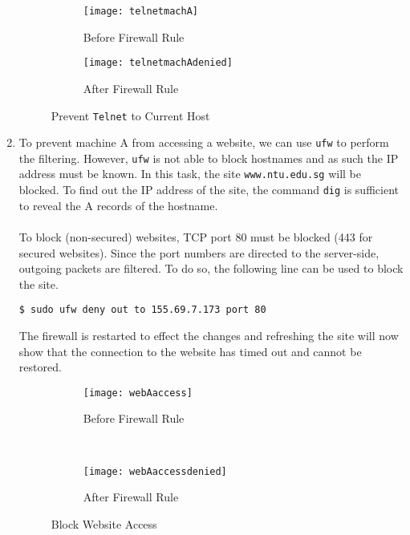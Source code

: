 \documentclass[a4paper,12pt]{article}
\begin{document}
\begin{enumerate}
\begin{figure}[H]
    \centering
\begin{subfigure}[H]{1\textwidth}
\centering
\texttt{[image: telnetmachA]}
\caption{Before Firewall Rule}
\label{fig:MachA}
\end{subfigure}
\vspace{1em}
\begin{subfigure}[H]{1\textwidth}
\centering
\texttt{[image: telnetmachAdenied]}
\caption{After Firewall Rule}
\label{fig:MachADenied}
\end{subfigure}
    \caption{Prevent \texttt{Telnet} to Current Host}
\end{figure}
\item To prevent machine A from accessing a website, we can use \texttt{ufw} to perform the filtering. However, \texttt{ufw} is not able to block hostnames and as such the IP address must be known. In this task, the site \texttt{www.ntu.edu.sg} will be blocked. To find out the IP address of the site, the command \texttt{dig} is sufficient to reveal the A records of the hostname.\\\\To block (non-secured) websites, TCP port 80 must be blocked (443 for secured websites). Since the port numbers are directed to the server-side, outgoing packets are filtered. To do so, the following line can be used to block the site.
\begin{verbatim}
$ sudo ufw deny out to 155.69.7.173 port 80
\end{verbatim}
The firewall is restarted to effect the changes and refreshing the site will now show that the connection to the website has timed out and cannot be restored.
\begin{figure}[H]
    \centering
\begin{subfigure}[H]{0.45\textwidth}
\centering
\texttt{[image: webAaccess]}
\caption{Before Firewall Rule}
\label{fig:WebA}
\end{subfigure}
~
\begin{subfigure}[H]{0.45\textwidth}
\centering
\texttt{[image: webAaccessdenied]}
\caption{After Firewall Rule}
\label{fig:WebADenied}
\end{subfigure}
    \caption{Block Website Access}
\end{figure}
\end{enumerate}
\end{document}
